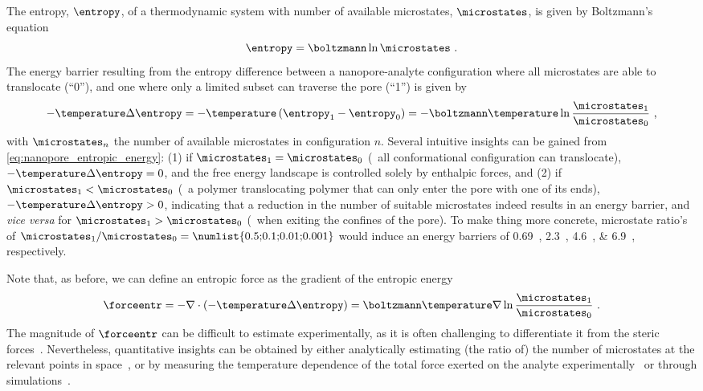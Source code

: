 The entropy, $\entropy$, of a thermodynamic system with number of available microstates, $\microstates$, is
given by Boltzmann's equation~\cite{Neumann-1980}
%
\begin{equation}\label{eq:nanopores_entropy}
  \entropy = \boltzmann \ln \microstates \text{ .}
\end{equation}
%
The energy barrier resulting from the entropy difference between a nanopore-analyte configuration where all
microstates are able to translocate (``0''), and one where only a limited subset can traverse the pore (``1'')
is given by
%
\begin{equation}\label{eq:nanopore_entropic_energy}
  - \temperature \Delta \entropy = - \temperature \left( \entropy_1 - \entropy_0\right)
  = - \boltzmann \temperature \ln \dfrac{\microstates_1}{\microstates_0}
  \text{ ,}
\end{equation}
%
with $\microstates_n$ the number of available microstates in configuration $n$. Several intuitive insights can
be gained from \cref{eq:nanopore_entropic_energy}: (1) if $\microstates_1 = \microstates_0$ (\eg~all
conformational configuration can translocate), $- \temperature \Delta \entropy = 0$, and the free energy
landscape is controlled solely by enthalpic forces, and (2) if $\microstates_1 < \microstates_0$ (\eg~a
polymer translocating polymer that can only enter the pore with one of its ends), $- \temperature \Delta
\entropy > 0$, indicating that a reduction in the number of suitable microstates indeed results in an energy
barrier, and \emph{vice versa} for $\microstates_1 > \microstates_0$ (\eg~when exiting the confines of the
pore). To make thing more concrete, microstate ratio's of $\microstates_1 / \microstates_0 =
\text{\numlist{0.5;0.1;0.01;0.001}}$ would induce an energy barriers of \SIlist{0.69;2.3;4.6;6.9}{\kbt},
respectively.

Note that, as before, we can define an entropic force as the gradient of the entropic
energy~\cite{Neumann-1980}
%
\begin{equation}\label{eq:nanopore_entropic_force}
  \forceentr = - \nabla \cdot (- \temperature \Delta \entropy )  
             = \boltzmann \temperature \nabla \ln \dfrac{\microstates_1}{\microstates_0}
  \text{ .}
\end{equation}
%
The magnitude of $\forceentr$ can be difficult to estimate experimentally, as it is often challenging to
differentiate it from the steric forces~\cite{Buchsbaum-2013}. Nevertheless, quantitative insights can be
obtained by either analytically estimating (the ratio of) the number of microstates at the relevant points in
space~\cite{Tian-2003,Muthukumar-2010,Cressiot-2015}, or by measuring the temperature dependence of the total
force exerted on the analyte experimentally~\cite{Meller-2002,Payet-2015} or through
simulations~\cite{Tian-2003,Matysiak-2006,Vaitheeswaran-2014,Luo-2017}.




